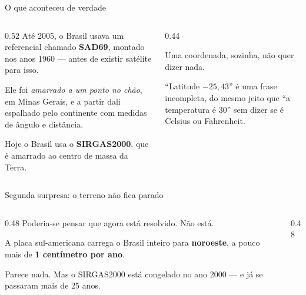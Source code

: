 \documentclass[aspectratio=169,11pt]{beamer}
\newcommand{\bnum}[1]{\textbf{\textcolor{mTeal}{#1}}}
\begin{document}
\begin{frame}{O que aconteceu de verdade}
  \begin{columns}[c]
    \begin{column}{0.52\textwidth}
      Até 2005, o Brasil usava um referencial chamado \textbf{SAD69}, montado nos anos 1960
      --- antes de existir satélite para isso.
      \medskip

      Ele foi \emph{amarrado a um ponto no chão}, em Minas Gerais, e a partir dali espalhado
      pelo continente com medidas de ângulo e distância.
      \medskip

      Hoje o Brasil usa o \bnum{SIRGAS2000}, que é amarrado ao \alert{centro de massa da
      Terra}.
    \end{column}
    \begin{column}{0.44\textwidth}
      \begin{armadilha}[title={A lição desconfortável}]
        Uma coordenada, sozinha, \alert{não quer dizer nada}.
        \medskip

        ``Latitude $-25{,}43$'' é uma frase incompleta, do mesmo jeito que ``a temperatura
        é 30'' sem dizer se é Celsius ou Fahrenheit.
      \end{armadilha}
    \end{column}
  \end{columns}
\end{frame}

\begin{frame}{Segunda surpresa: o terreno não fica parado}
  \begin{columns}[T]
    \begin{column}{0.48\textwidth}
      Poderia-se pensar que agora está resolvido. Não está.
      \medskip

      A placa sul-americana carrega o Brasil inteiro para \bnum{noroeste}, a pouco mais de
      \bnum{1 centímetro por ano}.
      \medskip

      Parece nada. Mas o SIRGAS2000 está congelado no ano 2000 --- e já se passaram mais de
      \alert{25 anos}.
    \end{column}
    \begin{column}{0.48\textwidth}
      \centering
    \end{column}
  \end{columns}
\end{frame}
\end{document}
